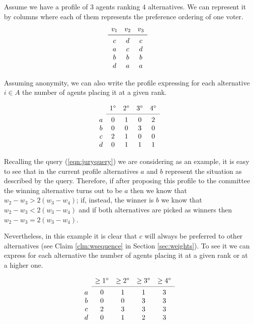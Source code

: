 Assume we have a profile of $3$ agents ranking $4$ alternatives. We can represent it by columns where each of them represents the preference ordering of one voter.
\[
\begin{array}{ccc}
v_1
& v_2
& v_3 \\
\midrule 
c
& d
& c \\
a
& c
& d \\
b
& b
& b \\
d
& a
& a \\
\end{array}
\]

Assuming anonymity, we can also write the profile expressing for each alternative $i \in A$ the number of agents placing it at a given rank.

\[
\begin{array}{ccccc}
& 1^\circ
& 2^\circ
& 3^\circ
& 4^\circ \\
\cmidrule{2-5}
a 
& 0
& 1
& 0
& 2 \\
b
& 0
& 0
& 3
& 0 \\
c
& 2
& 1
& 0
& 0 \\
d
& 0
& 1
& 1
& 1 \\
\end{array}
\]

Recalling the query (\ref{eqn:juryquery}) we are considering as an example, it is easy to see that in the current profile alternatives $a$ and $b$ represent the situation as described by the query. Therefore, if after proposing this profile to the committee the winning alternative turns out to be $a$ then we know that $w_{2} - w_{3} > 2(w_{3} - w_{4})$; if, instead, the winner is $b$ we know that $w_{2} - w_{3} < 2(w_{3} - w_{4})$ and if both alternatives are picked as winners then $w_{2} - w_{3} = 2(w_{3} - w_{4})$. 

Nevertheless, in this example it is clear that $c$ will always be preferred to other alternatives (see Claim \ref{clm:wsequence} in Section \ref{sec:weights}). To see it we can express for each alternative the number of agents placing it at a given rank or at a higher one.

\[
\begin{array}{ccccc}
& \geq 1^\circ
& \geq 2^\circ
& \geq 3^\circ
& \geq 4^\circ \\
\cmidrule{2-5}
a 
& 0
& 1
& 1
& 3 \\
b
& 0
& 0
& 3
& 3 \\
c
& 2
& 3
& 3
& 3 \\
d
& 0
& 1
& 2
& 3 \\
\end{array}
\]


